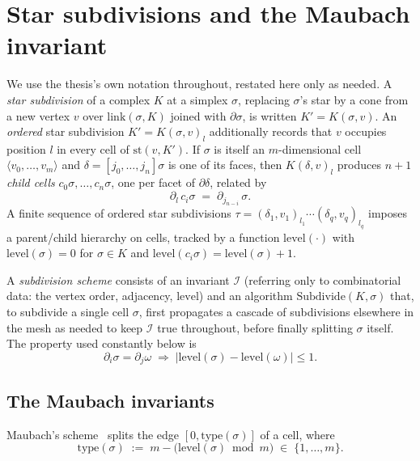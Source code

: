 \documentclass[11pt]{article}
\newcommand{\type}{\mathrm{type}}
\newcommand{\level}{\mathrm{level}}
\newcommand{\link}{\mathrm{link}}
\newcommand{\st}{\mathrm{st}}
\begin{document}
\section{Star subdivisions and the Maubach invariant}
\label{sec:maubach}

We use the thesis's own notation throughout, restated here only as needed.
A \emph{star subdivision} of a complex $K$ at a simplex $\sigma$, replacing
$\sigma$'s star by a cone from a new vertex $v$ over $\link(\sigma,K)$
joined with $\partial\sigma$, is written $K'=K(\sigma,v)$. An
\emph{ordered} star subdivision $K'=K(\sigma,v)_l$ additionally records
that $v$ occupies position $l$ in every cell of $\st(v,K')$. If $\sigma$ is
itself an $m$-dimensional cell $\langle v_0,\dots,v_m\rangle$ and
$\delta=[j_0,\dots,j_n]\sigma$ is one of its faces, then $K(\delta,v)_l$
produces $n+1$ \emph{child cells} $c_0\sigma,\dots,c_n\sigma$, one per
facet of $\partial\delta$, related by
\[
  \partial_l\, c_i\sigma \;=\; \partial_{j_{n-i}}\,\sigma .
\]
A finite sequence of ordered star subdivisions
$\tau=(\delta_1,v_1)_{l_1}\cdots(\delta_q,v_q)_{l_q}$ imposes a parent/child
hierarchy on cells, tracked by a function $\level(\cdot)$ with
$\level(\sigma)=0$ for $\sigma\in K$ and $\level(c_i\sigma)=\level(\sigma)+1$.

A \emph{subdivision scheme} consists of an invariant $\mathcal I$
(referring only to combinatorial data: the vertex order, adjacency,
$\level$) and an algorithm $\mathrm{Subdivide}(K,\sigma)$ that, to subdivide
a single cell $\sigma$, first propagates a cascade of subdivisions
elsewhere in the mesh as needed to keep $\mathcal I$ true throughout,
before finally splitting $\sigma$ itself. The property used constantly
below is
\begin{equation}
  \partial_i\sigma=\partial_j\omega \;\Longrightarrow\; |\level(\sigma)-\level(\omega)|\le 1 .
  \tag{OneLevel}
\end{equation}

\subsection{The Maubach invariants}

Maubach's scheme~\cite{maubach} splits the edge $[0,\type(\sigma)]$ of a
cell, where
\[
  \type(\sigma) \;:=\; m - \big(\level(\sigma)\bmod m\big) \;\in\;\{1,\dots,m\}.
\]
\end{document}
